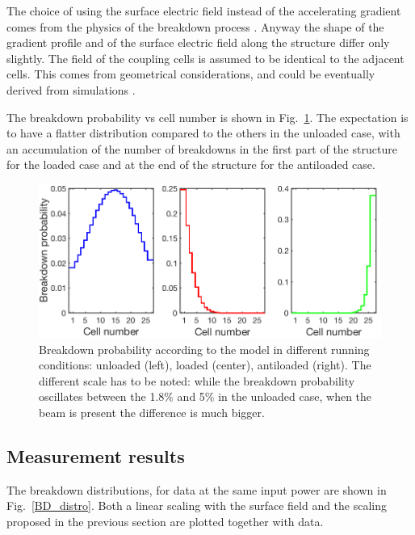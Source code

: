 The choice of using the surface electric field instead of the accelerating gradient comes from the physics of the breakdown process \cite{Walter:PC}. Anyway the shape of the gradient profile and of the surface electric field along the structure differ only slightly. The field of the coupling cells is assumed to be identical to the adjacent cells. This comes from geometrical considerations, and could be eventually derived from simulations \cite{Alexej:PC}.

The breakdown probability vs cell number is shown in Fig.~\ref{BD_prob}. The expectation is to have a flatter distribution compared to the others in the unloaded case, with an accumulation of the number of breakdowns in the first part of the structure for the loaded case and at the end of the structure for the antiloaded case.


\begin{figure}[h]
\centering 
\includegraphics[scale=0.45]{pictures/BD_probability_2.png}
\caption{Breakdown probability according to the model in different running conditions: unloaded (left), loaded (center), antiloaded (right). The different scale has to be noted: while the breakdown probability oscillates between the 1.8\% and 5\% in the unloaded case, when the beam is present the difference is much bigger.}
\label{BD_prob}
\end{figure}


\subsection[Measurement results]{Measurement results}
\label{sec:results}

The breakdown distributions, for data at the same input power are shown in Fig.~\ref{BD_distro}. Both a linear scaling with the surface field and the scaling proposed in the previous section are plotted together with data.

